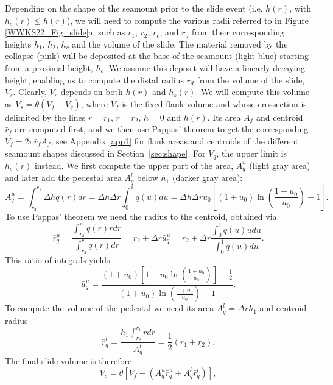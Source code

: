Depending on the shape of the seamount prior to the slide event (i.e. $h(r)$, with $h_s(r) \le h(r)$), we will
need to compute the various radii referred to in Figure \ref{WWKS22_Fig_slide}a, such as $r_1$, $r_2$, $r_c$, and $r_d$
from their corresponding heights $h_1$, $h_2$, $h_c$ and the volume of the slide. The material removed by the collapse (pink)
will be deposited at the base of the seamount (light blue) starting from a proximal height, $h_c$.  We assume this
deposit will have a linearly decaying height, enabling us to compute the distal radius $r_d$ from the volume of the slide,
$V_s$.  Clearly, $V_s$ depends on both $h(r)$ and $h_s(r)$.  We will compute this volume as $V_s = \theta (V_f - V_q)$, where $V_f$
is the fixed flank volume and whose crossection is delimited by the lines $r = r_1$, $r = r_2$, $h = 0$ and $h(r)$.  Its area $A_f$ and
centroid $\bar{r}_f$ are computed first, and we then use Pappas' theorem to get the corresponding $V_f = 2\pi\bar{r}_f A_f$;
see Appendix \ref{app1} for flank areas and centroids of the different seamount shapes discussed in
Section~\ref{sec:shape}.  For $V_q$, the upper limit is $h_s(r)$ instead. We first compute the upper part of the area,
$A^u_q$ (light gray area) and later add the pedestal area $A^l_q$ below $h_1$ (darker gray area):
\begin{equation*}
A^u_q = \int_{r_2}^{r_1} \Delta h q(r) dr = \Delta h \Delta r \int_0^1 q(u) du = \Delta h \Delta r u_0 \left [ (1 + u_0) \ln \left (\frac{1 + u_0}{u_0} \right ) - 1 \right ].
\end{equation*}
To use Pappas' theorem we need the radius to the centroid, obtained via
\begin{equation*}
\bar{r}^u_q = \frac{\int_{r_2}^{r_1}q(r)rdr}{\int_{r_2}^{r_1}q(r)dr} = r_2 + \Delta r \bar{u}_q^u = r_2 + \Delta r \frac{\int_0^1q(u)udu}{\int_0^1 q(u)du}.
\end{equation*}
This ratio of integrals yields
\begin{equation*}
\bar{u}^u_q = \frac{(1 + u_0)\left [1 - u_0 \ln \left ( \frac{1+u_0}{u_0} \right ) \right ] - \frac{1}{2}}{(1 + u_0) \ln \left (\frac{1 + u_0}{u_0} \right ) - 1}.
\end{equation*}
To compute the volume of the pedestal we need its area $A^l_q = \Delta r h_1$ and centroid radius
\begin{equation*}
\bar{r}^l_q = \frac{ h_1\int_{r_2}^{r_1} rdr}{A^l_q} = \frac{1}{2} (r_1 + r_2).
\end{equation*}
The final slide volume is therefore
\begin{equation*}
V_s = \theta \left [ V_f - \left (A^u_q \bar{r}^u_q + A^l_q \bar{r}^l_q \right ) \right ],
\end{equation*}
